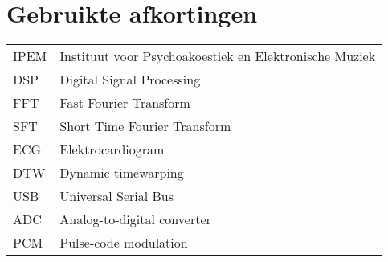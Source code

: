 \chapter{Gebruikte afkortingen}
\begin{flushleft}
	\renewcommand{\baselinestretch}{1.5}
	\small\normalsize
	\begin{longtable}{ll}
		IPEM				&  Instituut voor Psychoakoestiek en Elektronische Muziek \\
		DSP					&  Digital Signal Processing \\
		FFT					&  Fast Fourier Transform \\
		SFT					&  Short Time Fourier Transform \\
		ECG					&  Elektrocardiogram \\
		DTW					&  Dynamic timewarping \\
		USB					&  Universal Serial Bus \\
		ADC					&  Analog-to-digital converter \\
		PCM					&  Pulse-code modulation
		
	\end{longtable}
\end{flushleft}